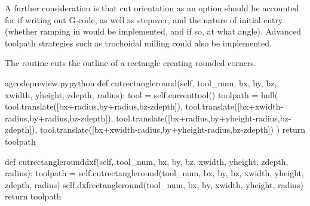 \documentclass{ltxdoc}
\begin{document}
A further consideration is that cut orientation as an option should be accounted for if writing out G-code, as well as stepover, and the nature of initial entry (whether ramping in would be implemented, and if so, at what angle). Advanced toolpath strategies such as trochoidal milling could also be implemented.

The routine  cuts the outline of a rectangle creating rounded corners.

\lstset{firstnumber=\thegcpy}
\begin{writecode}{a}{gcodepreview.py}{python}
    def cutrectangleround(self, tool_num, bx, by, bz, xwidth, yheight, zdepth, radius):
        tool = self.currenttool()
        toolpath = hull(
            tool.translate([bx+radius,by+radius,bz-zdepth]),
            tool.translate([bx+xwidth-radius,by+radius,bz-zdepth]),
            tool.translate([bx+radius,by+yheight-radius,bz-zdepth]),
            tool.translate([bx+xwidth-radius,by+yheight-radius,bz-zdepth])
            )
        return toolpath

    def cutrectanglerounddxf(self, tool_num, bx, by, bz, xwidth, yheight, zdepth, radius):
        toolpath = self.cutrectangleround(tool_num, bx, by, bz, xwidth, yheight, zdepth, radius)
        self.dxfrectangleround(tool_num, bx, by, xwidth, yheight, radius)
        return toolpath

\end{writecode}
\addtocounter{gcpy}{15}

\end{document}
